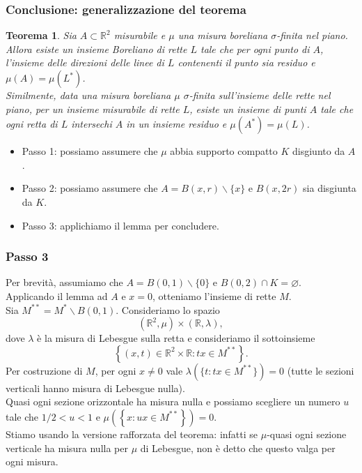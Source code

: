 \documentclass[11pt]{beamer} %
\newcommand{\<}{\langle}
\renewcommand{\>}{\rangle}
\theoremstyle{theorem}
\newtheorem{teo}{Teorema}
\theoremstyle{theorem}
\theoremstyle{theorem}
\theoremstyle{theorem}
\theoremstyle{theorem}
\begin{document}
\begin{frame}[fragile]
\frametitle{Conclusione: generalizzazione del teorema}

\begin{teo}
	Sia $A \subset \mathbb{R}^{2}$ misurabile e $\mu$ una misura boreliana $\sigma$-finita nel piano. Allora esiste un insieme Boreliano di rette $L$ tale che per ogni punto di $A$, l'insieme delle direzioni delle linee di $L$ contenenti il punto sia residuo e $\mu(A)=\mu(L^*)$. \\ \pause
	Similmente, data una misura boreliana $\mu$ $\sigma$-finita sull'insieme delle rette nel piano, per un insieme misurabile di rette $L$, esiste un insieme di punti $A$ tale che ogni retta di $L$ intersechi $A$ in un insieme residuo e $\mu(A^*)=\mu(L)$.
\end{teo}
	\pause

	\begin{itemize}
		\item Passo 1: possiamo assumere che $\mu$ abbia supporto compatto $K$ disgiunto da $A$.\\
		\item Passo 2: possiamo assumere che $A=B(x, r) \backslash\{x\}$ e $B(x, 2 r)$ sia disgiunta da $K$.\\
		\item Passo 3: applichiamo il lemma per concludere.
	\end{itemize}
\end{frame}


\begin{frame}
\frametitle{Passo 3}
Per brevità, assumiamo che $A=B(0,1) \backslash\{0\}$ e $B(0,2) \cap K=\varnothing$.\\ \pause
Applicando il lemma ad $A$ e $x=0$, otteniamo l'insieme di rette $M$.\\ \pause Sia $M^{* *}=M^{*} \backslash B(0,1)$. Consideriamo lo spazio
$$
\left(\mathbb{R}^{2}, \mu\right) \times(\mathbb{R}, \lambda),
$$
dove $\lambda$ è la misura di Lebesgue sulla retta e consideriamo il sottoinsieme
$$
\left\{(x, t) \in \mathbb{R}^{2} \times \mathbb{R}: t x \in M^{* *}\right\} .
$$ \pause
Per costruzione di $M$, per ogni $x \neq 0$ vale $\lambda(\{t: tx \in M^{**}\})=0$ (tutte le sezioni verticali hanno misura di Lebesgue nulla).\\ \pause
Quasi ogni sezione orizzontale ha misura nulla e possiamo scegliere un numero $u$ tale che $1 / 2<u<1$ e $\mu\left(\left\{x: u x \in M^{* *}\right\}\right)=0$.\\ \pause
Stiamo usando la versione rafforzata del teorema: infatti se $\mu$-quasi ogni sezione verticale ha misura nulla per $\mu$ di Lebesgue, non è detto che questo valga per ogni misura.\\

\end{frame}
\end{document}
